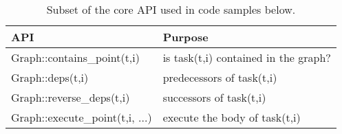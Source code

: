 \begin{table}[t]
\small
\begin{tabular}{l | l}
API & Purpose \\
\hline
Graph::contains\_point(t,i) & is task(t,i) contained in the graph? \\
Graph::deps(t,i) & predecessors of task(t,i) \\
Graph::reverse\_deps(t,i) & successors of task(t,i)\\
Graph::execute\_point(t,i, ...) & execute the body of task(t,i) \\
\end{tabular}

\caption{Subset of the core API used in code samples below.\label{tab:api}}
\vspace{-0.75cm}
\end{table}

